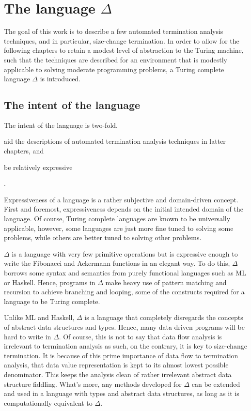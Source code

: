 \newcommand{\D}{$\Delta$}
\chapter{The language \D{}}

The goal of this work is to describe a few automated termination analysis
techniques, and in particular, size-change termination. In order to allow for
the following chapters to retain a modest level of abstraction to the Turing
machine, such that the techniques are described for an environment that is
modestly applicable to solving moderate programming problems, a Turing complete
language \D{} is introduced.

\section{The intent of the language}

The intent of the language is two-fold, \begin{inparaenum}[(1)]\item aid the
descriptions of automated termination analysis techniques in latter
chapters, and \item be relatively expressive\end{inparaenum}.

Expressiveness of a language is a rather subjective and domain-driven concept.
First and foremost, expressiveness depends on the initial intended domain of
the language. Of course, Turing complete languages are known to be universally
applicable, however, some languages are just more fine tuned to solving some
problems, while others are better tuned to solving other problems.

\D{} is a language with very few primitive operations but is expressive enough
to write the Fibonacci and Ackermann functions in an elegant way. To do this,
\D{} borrows some syntax and semantics from purely functional languages such as
ML or Haskell. Hence, programs in \D{} make heavy use of pattern matching and
recursion to achieve branching and looping, some of the constructs required for
a language to be Turing complete.

Unlike ML and Haskell, \D{} is a language that completely disregards the
concepts of abstract data structures and types. Hence, many data driven
programs will be hard to write in \D{}. Of course, this is not to say that data
flow analysis is irrelevant to termination analysis as such, on the contrary,
it is key to size-change termination. It is because of this prime importance of
data flow to termination analysis, that data value representation is kept to
its almost lowest possible denominator. This keeps the analysis clean of rather
irrelevant abstract data structure fiddling. What's more, any methods developed
for \D{} can be extended and used in a language with types and abstract data
structures, as long as it is computationally equivalent to \D{}.

